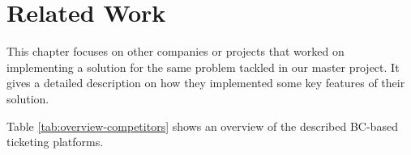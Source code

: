 \chapter{Related Work}
This chapter focuses on other companies or projects that worked on implementing a solution for the same problem tackled in our master project. It gives a detailed description on how they implemented some key features of their solution. 


Table \ref{tab:overview-competitors} shows an overview of the described BC-based ticketing platforms.







